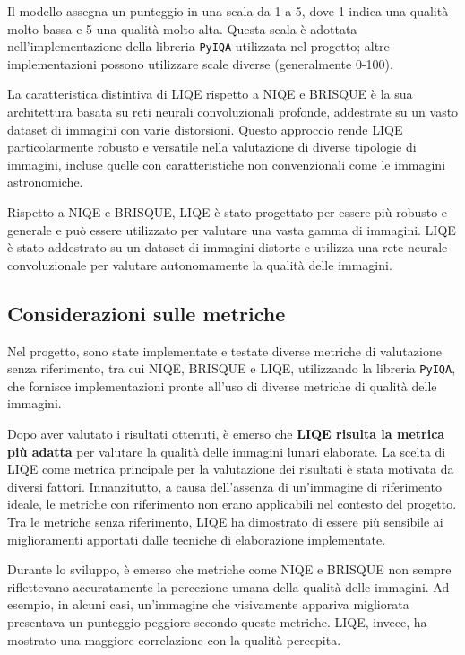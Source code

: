 Il modello assegna un punteggio in una scala da 1 a 5, dove 1 indica una qualità molto bassa e 5 una qualità molto alta. Questa scala è adottata nell'implementazione della libreria \texttt{PyIQA} utilizzata nel progetto; altre implementazioni possono utilizzare scale diverse (generalmente 0-100).

La caratteristica distintiva di LIQE rispetto a NIQE e BRISQUE è la sua architettura basata su reti neurali convoluzionali profonde, addestrate su un vasto dataset di immagini con varie distorsioni. Questo approccio rende LIQE particolarmente robusto e versatile nella valutazione di diverse tipologie di immagini, incluse quelle con caratteristiche non convenzionali come le immagini astronomiche.

Rispetto a NIQE e BRISQUE, LIQE è stato progettato per essere più robusto e generale e può essere utilizzato per valutare una vasta gamma di immagini. LIQE è stato addestrato su un dataset di immagini distorte e utilizza una rete neurale convoluzionale per valutare autonomamente la qualità delle immagini.

\subsection{Considerazioni sulle metriche} \label{subsec:why_liqe}

Nel progetto, sono state implementate e testate diverse metriche di valutazione senza riferimento, tra cui NIQE, BRISQUE e LIQE, utilizzando la libreria \texttt{PyIQA}, che fornisce implementazioni pronte all'uso di diverse metriche di qualità delle immagini.

Dopo aver valutato i risultati ottenuti, è emerso che \textbf{LIQE risulta la metrica più adatta} per valutare la qualità delle immagini lunari elaborate. La scelta di LIQE come metrica principale per la valutazione dei risultati è stata motivata da diversi fattori. Innanzitutto, a causa dell'assenza di un'immagine di riferimento ideale, le metriche con riferimento non erano applicabili nel contesto del progetto. Tra le metriche senza riferimento, LIQE ha dimostrato di essere più sensibile ai miglioramenti apportati dalle tecniche di elaborazione implementate.

Durante lo sviluppo, è emerso che metriche come NIQE e BRISQUE non sempre riflettevano accuratamente la percezione umana della qualità delle immagini. Ad esempio, in alcuni casi, un'immagine che visivamente appariva migliorata presentava un punteggio peggiore secondo queste metriche. LIQE, invece, ha mostrato una maggiore correlazione con la qualità percepita.

